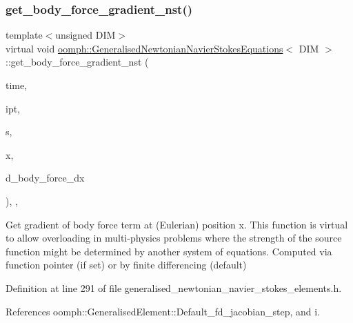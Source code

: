 \subsubsection{\texorpdfstring{get\+\_\+body\+\_\+force\+\_\+gradient\+\_\+nst()}{get\_body\_force\_gradient\_nst()}}
{\footnotesize\ttfamily template$<$unsigned D\+IM$>$ \\
virtual void \hyperlink{classoomph_1_1GeneralisedNewtonianNavierStokesEquations}{oomph\+::\+Generalised\+Newtonian\+Navier\+Stokes\+Equations}$<$ D\+IM $>$\+::get\+\_\+body\+\_\+force\+\_\+gradient\+\_\+nst (\begin{DoxyParamCaption}\item[{const double \&}]{time,  }\item[{const unsigned \&}]{ipt,  }\item[{const \hyperlink{classoomph_1_1Vector}{Vector}$<$ double $>$ \&}]{s,  }\item[{const \hyperlink{classoomph_1_1Vector}{Vector}$<$ double $>$ \&}]{x,  }\item[{\hyperlink{classoomph_1_1DenseMatrix}{Dense\+Matrix}$<$ double $>$ \&}]{d\+\_\+body\+\_\+force\+\_\+dx }\end{DoxyParamCaption})\hspace{0.3cm}{\ttfamily [inline]}, {\ttfamily [protected]}, {\ttfamily [virtual]}}

Get gradient of body force term at (Eulerian) position x. This function is virtual to allow overloading in multi-\/physics problems where the strength of the source function might be determined by another system of equations. Computed via function pointer (if set) or by finite differencing (default) 

Definition at line 291 of file generalised\+\_\+newtonian\+\_\+navier\+\_\+stokes\+\_\+elements.\+h.



References oomph\+::\+Generalised\+Element\+::\+Default\+\_\+fd\+\_\+jacobian\+\_\+step, and i.

\mbox{\label{classoomph_1_1GeneralisedNewtonianNavierStokesEquations_a1cb7e8f48bfc9cd81f63405fb2fd1795}} 
